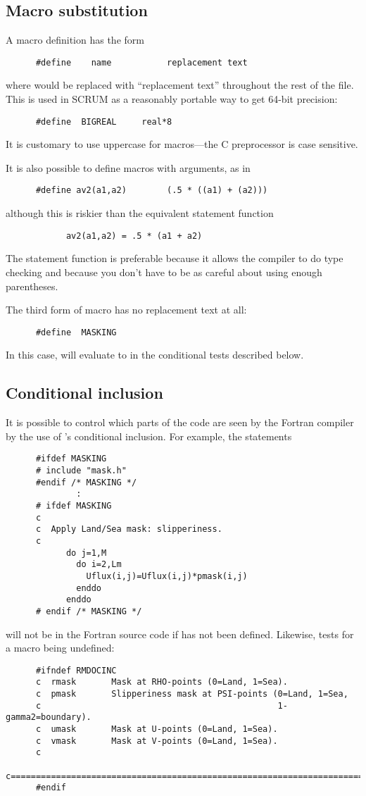 \subsection{Macro substitution}
A macro definition has the form
\begin{verbatim}
      #define    name           replacement text
\end{verbatim}
where  would be replaced with ``replacement text''
throughout the rest of the file.  This is used in SCRUM as a
reasonably portable way to get 64-bit precision:
\begin{verbatim}
      #define  BIGREAL     real*8
\end{verbatim}
It is customary to use uppercase for  macros---the C
preprocessor is case sensitive.

It is also possible to define macros with arguments, as in
\begin{verbatim}
      #define av2(a1,a2)        (.5 * ((a1) + (a2)))
\end{verbatim}
although this is riskier than the equivalent statement function
\begin{verbatim}
            av2(a1,a2) = .5 * (a1 + a2)
\end{verbatim}
The statement function is preferable because it allows the compiler
to do type checking and because you don't have to be as careful
about using enough parentheses.

The third form of macro has no replacement text at all:
\begin{verbatim}
      #define  MASKING
\end{verbatim}
In this case,  will evaluate to  in the
conditional tests described below.

\subsection{Conditional inclusion}
It is possible to control which parts of the code are seen by the
Fortran compiler by the use of 's conditional inclusion.
For example, the statements
\begin{verbatim}
      #ifdef MASKING
      # include "mask.h"
      #endif /* MASKING */
              :
      # ifdef MASKING
      c
      c  Apply Land/Sea mask: slipperiness.
      c
            do j=1,M
              do i=2,Lm
                Uflux(i,j)=Uflux(i,j)*pmask(i,j)
              enddo
            enddo
      # endif /* MASKING */
\end{verbatim}
will not be in the Fortran source code if  has not
been defined.  Likewise,
 tests for a macro being undefined:
\begin{verbatim}
      #ifndef RMDOCINC
      c  rmask       Mask at RHO-points (0=Land, 1=Sea).
      c  pmask       Slipperiness mask at PSI-points (0=Land, 1=Sea,
      c                                               1-gamma2=boundary).
      c  umask       Mask at U-points (0=Land, 1=Sea).
      c  vmask       Mask at V-points (0=Land, 1=Sea).
      c
      c=======================================================================
      #endif
\end{verbatim}

